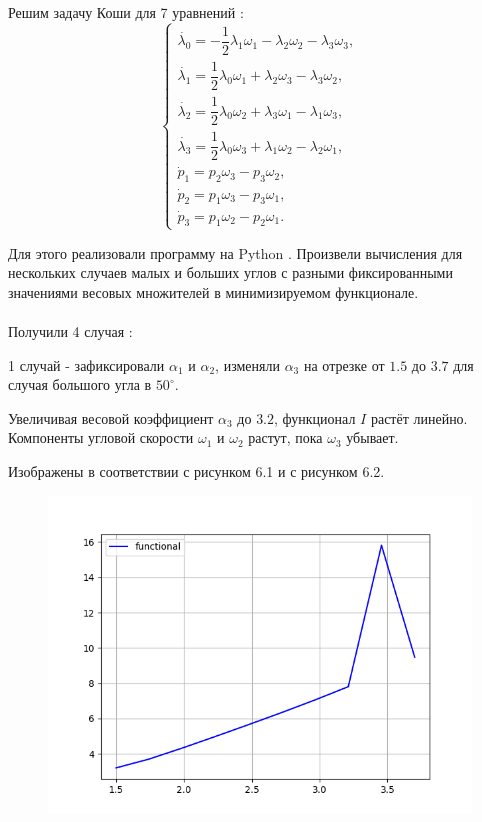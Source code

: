 \documentclass[14pt]{extreport}
\begin{document}
Решим задачу Коши для 7 уравнений \cite{moiseev}:
\begin{equation}
\begin{cases}
\dot{\lambda_{0}} = -\dfrac{1}{2} \lambda_{1}\omega_{1} - \lambda_{2}\omega_{2} - \lambda_{3}\omega_{3},\\
\dot{\lambda_{1}} = \dfrac{1}{2} \lambda_{0}\omega_{1} + \lambda_{2}\omega_{3} - \lambda_{3}\omega_{2},\\
\dot{\lambda_{2}} = \dfrac{1}{2} \lambda_{0}\omega_{2} + \lambda_{3}\omega_{1} - \lambda_{1}\omega_{3},\\
\dot{\lambda_{3}} = \dfrac{1}{2} \lambda_{0}\omega_{3} + \lambda_{1}\omega_{2} - \lambda_{2}\omega_{1},\\
\dot{p}_1 = p_2 \omega_3 - p_3 \omega_2,\\
\dot{p}_2 = p_1 \omega_3 - p_3 \omega_1,\\
\dot{p}_3 = p_1 \omega_2 - p_2 \omega_1.
\end{cases}
\end{equation}

Для этого реализовали программу на Python \cite{python}. Произвели вычисления для нескольких случаев малых и больших углов с разными фиксированными значениями весовых множителей в минимизируемом функционале.\\\\

Получили 4 случая \cite{scipy}:

1 случай - зафиксировали $\alpha_1$ и $\alpha_2$, изменяли $\alpha_3$ на отрезке от $1.5$ до $3.7$ для случая большого угла в $50^{\circ}$.

Увеличивая весовой коэффициент $\alpha_3$ до $3.2$, функционал $I$ растёт линейно. Компоненты угловой скорости $\omega_1$ и $\omega_2$ растут, пока $\omega_3$ убывает.

Изображены в соответствии с рисунком 6.1 и с рисунком 6.2.

\begin{figure}[H]
\center\includegraphics[scale=0.7]{fig/functional_1_5-3_7_50.png}
\caption{}
\end{figure}
\end{document}
